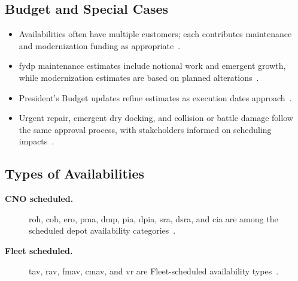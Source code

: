 \documentclass[../main.tex]{subfiles}
\begin{document}
\subsection{Budget and Special Cases}
\begin{itemize}
  \item Availabilities often have multiple customers; each contributes maintenance and modernization funding as appropriate~\autocite{edo-4-1-3-fleet-maint-policy-2025}.
  \item \ac{fydp} maintenance estimates include notional work and emergent growth, while modernization estimates are based on planned alterations~\autocite{edo-4-1-3-fleet-maint-policy-2025}.
  \item President's Budget updates refine estimates as execution dates approach~\autocite{edo-4-1-3-fleet-maint-policy-2025}.
  \item Urgent repair, emergent dry docking, and collision or battle damage follow the same approval process, with stakeholders informed on scheduling impacts~\autocite{edo-4-1-3-fleet-maint-policy-2025}.
\end{itemize}

\subsection{Types of Availabilities}
\begin{description}
  \item[\textbf{CNO scheduled.}] \ac{roh}, \ac{coh}, \ac{ero}, \ac{pma}, \ac{dmp}, \ac{pia}, \ac{dpia}, \ac{sra}, \ac{dsra}, and \ac{cia} are among the scheduled depot availability categories~\autocite{edo-4-1-3-fleet-maint-policy-2025}.
  \item[\textbf{Fleet scheduled.}] \ac{tav}, \ac{rav}, \ac{fmav}, \ac{cmav}, and \ac{vr} are Fleet-scheduled availability types~\autocite{edo-4-1-3-fleet-maint-policy-2025}.
\end{description}
\end{document}
